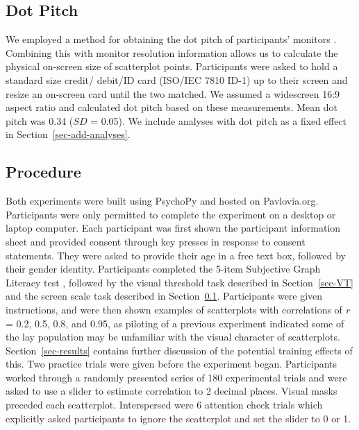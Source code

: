 \documentclass[manuscript, review, anonymous, screen]{acmart}
\begin{document}
\hypertarget{sec-dot-pitch}{%
\subsection{Dot Pitch}\label{sec-dot-pitch}}

We employed a method for obtaining the dot pitch of participants'
monitors \citep{screenscale}. Combining this with monitor resolution
information allows us to calculate the physical on-screen size of
scatterplot points. Participants were asked to hold a standard size
credit/ debit/ID card (ISO/IEC 7810 ID-1) up to their screen and resize
an on-screen card until the two matched. We assumed a widescreen 16:9
aspect ratio and calculated dot pitch based on these measurements. Mean
dot pitch was 0.34 (\(SD\) = 0.05). We include analyses with dot pitch
as a fixed effect in Section~\ref{sec-add-analyses}.

\hypertarget{sec-gen-procedure}{%
\subsection{Procedure}\label{sec-gen-procedure}}

Both experiments were built using PsychoPy \citep{pierce_2019} and
hosted on Pavlovia.org. Participants were only permitted to complete the
experiment on a desktop or laptop computer. Each participant was first
shown the participant information sheet and provided consent through key
presses in response to consent statements. They were asked to provide
their age in a free text box, followed by their gender identity.
Participants completed the 5-item Subjective Graph Literacy test
\citep{garcia_2016}, followed by the visual threshold task described in
Section~\ref{sec-VT} and the screen scale task described in
Section~\ref{sec-dot-pitch}. Participants were given instructions, and
were then shown examples of scatterplots with correlations of \emph{r} =
0.2, 0.5, 0.8, and 0.95, as piloting of a previous experiment indicated
some of the lay population may be unfamiliar with the visual character
of scatterplots. Section~\ref{sec-results} contains further discussion
of the potential training effects of this. Two practice trials were
given before the experiment began. Participants worked through a
randomly presented series of 180 experimental trials and were asked to
use a slider to estimate correlation to 2 decimal places. Visual masks
preceded each scatterplot. Interspersed were 6 attention check trials
which explicitly asked participants to ignore the scatterplot and set
the slider to 0 or 1.
\end{document}
